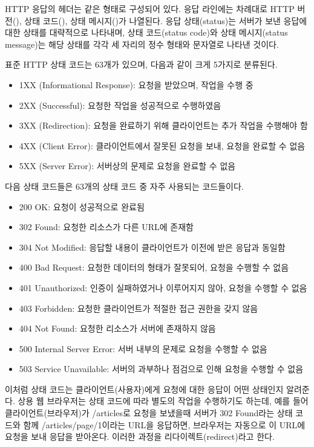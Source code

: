 HTTP 응답의 헤더는 \과 같은 형태로 구성되어 있다. 응답 라인에는 차례대로 HTTP 버전(), 상태 코드(), 상태 메시지()가 나열된다. 응답 상태(status)는 서버가 보낸 응답에 대한 상태를 대략적으로 나타내며, 상태 코드(status code)와 상태 메시지(status message)는 해당 상태를 각각 세 자리의 정수 형태와 문자열로 나타낸 것이다.

표준 HTTP 상태 코드는 63개가 있으며, 다음과 같이 크게 5가지로 분류된다.

\begin{itemize}
    \item 1XX (Informational Response): 요청을 받았으며, 작업을 수행 중
    \item 2XX (Successful): 요청한 작업을 성공적으로 수행하였음
    \item 3XX (Redirection): 요청을 완료하기 위해 클라이언트는 추가 작업을 수행해야 함
    \item 4XX (Client Error): 클라이언트에서 잘못된 요청을 보내, 요청을 완료할 수 없음
    \item 5XX (Server Error): 서버상의 문제로 요청을 완료할 수 없음
\end{itemize}

다음 상태 코드들은 63개의 상태 코드 중 자주 사용되는 코드들이다.

\begin{itemize}
    \item 200 OK: 요청이 성공적으로 완료됨
    \item 302 Found: 요청한 리소스가 다른 URL에 존재함
    \item 304 Not Modified: 응답할 내용이 클라이언트가 이전에 받은 응답과 동일함
    \item 400 Bad Request: 요청한 데이터의 형태가 잘못되어, 요청을 수행할 수 없음
    \item 401 Unauthorized: 인증이 실패하였거나 이루어지지 않아, 요청을 수행할 수 없음
    \item 403 Forbidden: 요청한 클라이언트가 적절한 접근 권한을 갖지 않음
    \item 404 Not Found: 요청한 리소스가 서버에 존재하지 않음
    \item 500 Internal Server Error: 서버 내부의 문제로 요청을 수행할 수 없음
    \item 503 Service Unavailable: 서버의 과부하나 점검으로 인해 요청을 수행할 수 없음
\end{itemize}

이처럼 상태 코드는 클라이언트(사용자)에게 요청에 대한 응답이 어떤 상태인지 알려준다. 상용 웹 브라우저는 상태 코드에 따라 별도의 작업을 수행하기도 하는데, 예를 들어 클라이언트(브라우저)가 /articles로 요청을 보냈을때 서버가 302 Found라는 상태 코드와 함께 /articles/page/1이라는 URL을 응답하면, 브라우저는 자동으로 이 URL에 요청을 보내 응답을 받아온다. 이러한 과정을 리다이렉트(redirect)라고 한다.

